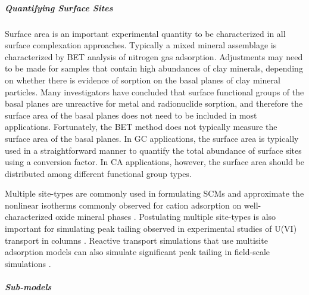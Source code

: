 \subparagraph{Quantifying Surface Sites}

Surface area is an important experimental quantity to be characterized in all surface complexation approaches. Typically a mixed mineral assemblage is characterized by BET analysis of nitrogen gas adsorption. Adjustments may need to be made for samples that contain high abundances of clay minerals, depending on whether there is evidence of sorption on the basal planes of clay mineral particles. Many investigators have concluded that surface functional groups of the basal planes are unreactive for metal and radionuclide sorption, and therefore the surface area of the basal planes does not need to be included in most applications. Fortunately, the BET method does not typically measure the surface area of the basal planes. In GC applications, the surface area is typically used in a straightforward manner to quantify the total abundance of surface sites using a conversion factor. In CA applications, however, the surface area should be distributed among different functional group types.

Multiple site-types are commonly used in formulating SCMs and approximate the nonlinear isotherms commonly observed for cation adsorption on well-characterized oxide mineral phases \citep{dzombak-1990, davis-1990}.  Postulating multiple site-types is also important for simulating peak tailing observed in experimental studies of U(VI) transport in columns \citep{kohler-1996}.  Reactive transport simulations that use multisite adsorption models can also simulate significant peak tailing in field-scale simulations \citep{curtis-2006, kent-2000, kent-2007, kent-2008}. 


\subparagraph{Sub-models}

